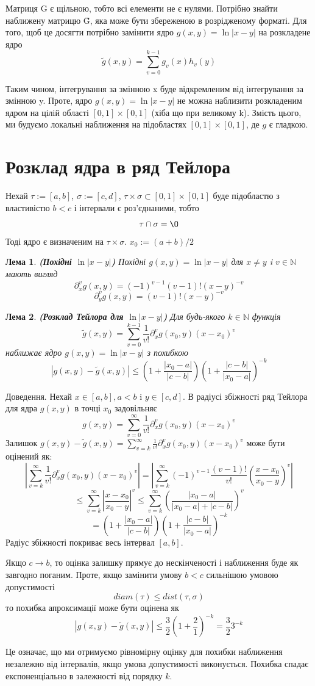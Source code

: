 \documentclass[12pt]{report}
\begin{document}
	\par Матриця G є щільною, тобто всі елементи не є нулями. Потрібно знайти наближену матрицю \~G, яка може бути збереженою в розрідженому форматі. Для того, щоб це досягти потрібно замінити ядро $g(x,y)=\ln|x-y|$ на розкладене ядро $$\tilde{g}(x,y)=\sum_{v=0}^{k-1}g_v(x)h_v(y)$$
	\par Таким чином, інтегрування за змінною x буде відкремленим від інтегрування за змінною y. Проте, ядро  $g(x,y)=\ln|x-y|$ не можна наблизити розкладеним ядром на цілій області $[0,1]\times[0,1]$ (хіба що при великому k). Змість цього, ми будуємо локальні наближення на підобластях $[0,1]\times[0,1]$, де $g$ є гладкою.
	\section{Розклад ядра в ряд Тейлора}
	\hspace{0.8cm}Нехай $\tau:=[a,b]$, $\sigma:=[c,d]$, $\tau\times\sigma\subset[0,1]\times[0,1]$ буде підобластю з властивістю $b<c$ і інтервали є роз'єднаними, тобто $$\tau\cap\sigma=\O$$
	Тоді ядро є визначеним на $\tau\times\sigma$. $x_0:=(a+b)/2$
	\newtheorem{Lem}{Лема}[chapter]
	\begin{Lem}
		{\bf (Похідні $\ln|x-y|$)} Похідні $g(x,y)=\ln|x-y|$ для $x\not=y$ i $v\in \mathbb{N}$ мають вигляд
		$$\partial^v_xg(x,y)=(-1)^{v-1}(v-1)!(x-y)^{-v}$$
		$$\partial^v_yg(x,y)=(v-1)!(x-y)^{-v}$$
	\end{Lem}
	\begin{Lem}
	{\bf (Розклад Тейлора для $\ln|x-y|$)} Для будь-якого $k\in \mathbb{N}$ функція 
	$$\tilde{g}(x,y)=\sum_{v=0}^{k-1}\frac{1}{v!}\partial^v_xg(x_0,y)(x-x_0)^v$$
	наближає ядро $g(x,y)=\ln|x-y|$ з похибкою
	$$|g(x,y)-\tilde{g}(x,y)|\le(1+\frac{|x_0-a|}{|c-b|})(1+\frac{|c-b|}{|x_0-a|})^{-k}$$
	\end{Lem}
	 Доведення. Нехай $x\in [a,b],a<b$ i $y\in [c,d]$. В радіусі збіжностi ряд Тейлора для ядра $g(x,y)$ в точці $x_0$ задовільняє $$g(x,y)=\sum_{v=0}^{\infty}\frac{1}{v!}\partial^v_xg(x_0,y)(x-x_0)^v$$
	Залишок $g(x,y)-\tilde{g}(x,y)=\sum_{v=k}^{\infty}\frac{1}{v!}\partial^v_xg(x_0,y)(x-x_0)^v$ може бути оцінений як:
	$$|\sum_{v=k}^{\infty}\frac{1}{v!}\partial^v_xg(x_0,y)(x-x_0)^v|= |\sum_{v=k}^{\infty}(-1)^{v-1}\frac{(v-1)!}{v!}\genfrac{(}{)}{1pt}{0}{x-x_0}{x_0-y}^v|$$
	$$\le \sum_{v=k}^{\infty}|\frac{x-x_0}{x_0-y}|^v\le\sum_{v=k}^{\infty}\genfrac{(}{)}{1pt}{0}{|x_0-a|}{|x_0-a|+|c-b|}^v $$
	$$=(1+\frac{|x_0-a|}{|c-b|})(1+\frac{|c-b|}{|x_0-a|})^{-k}$$
	\newline Радіус збіжності покриває весь інтервал $[a,b]$. 
	\newline
	\par Якщо $c\rightarrow b$, то оцінка залишку прямує до нескінченості і наближення буде як завгодно поганим. Проте, якщо замінити умову $b<c$  сильнішою умовою допустимості
	$$diam(\tau)\le dist(\tau,\sigma)$$
	то похибка апроксимації може бути оцінена як 
	$$|g(x,y)-\tilde{g}(x,y)|\le\frac{3}{2}(1+\frac{2}{1})^{-k}=\frac{3}{2}3^{-k}$$
	\par Це означає, що ми отримуємо рівномірну оцінку для похибки наближення незалежно від інтервалів, якщо умова допустимості виконується. Похибка спадає експоненціально в залежності від порядку $k$.
\end{document}
